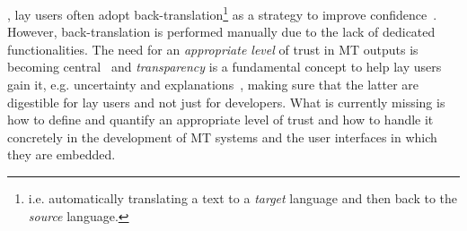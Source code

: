 , lay users often adopt %
back-translation\footnote{i.e. automatically translating a text to a \emph{target} language and then back to the \emph{source} language.} as a strategy to improve 
confidence~\citep{zouhar-etal-2021-backtranslation,mehandru-etal-2023-physician}. However, 
back-translation is performed manually 
due to the lack of dedicated functionalities. 
The need for an \emph{appropriate level} of trust in MT outputs is becoming central~\citep{martindale-carpuat-2018-fluency,deng2022generalpurposemachinetranslation}  and \emph{transparency} is a fundamental concept to help lay users gain it, e.g.  uncertainty and explanations~\citep{liao2023aitransparencyagellms}, making sure that the latter are %
digestible for lay users and not just for developers. What is currently missing is how to define and quantify an appropriate level of trust and how to handle it concretely in the development of MT systems and the user interfaces in which they are embedded.
